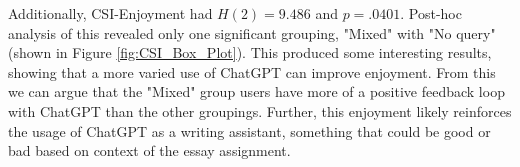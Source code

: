 \documentclass[manuscript,screen,acmsmall]{acmart}
\begin{document}
    Additionally, CSI-Enjoyment had $H(2) = 9.486$ and $p = .0401$. Post-hoc analysis of this revealed only one significant grouping, "Mixed" with "No query" (shown in Figure \ref{fig:CSI_Box_Plot}). This produced some interesting results, showing that a more varied use of ChatGPT can improve enjoyment.
    From this we can argue that the "Mixed" group users have more of a positive feedback loop with ChatGPT than the other groupings. Further, this enjoyment likely reinforces the usage of ChatGPT as a writing assistant, something that could be good or bad based on context of the essay assignment. 





\end{document}
